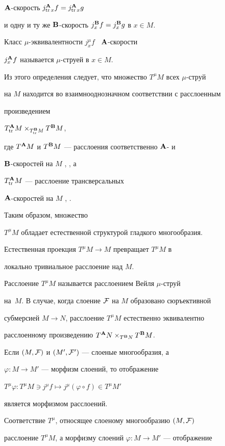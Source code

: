 ${\bold A}$-скорость $j_{\operatorname{tr} x}^{{\bold A}} f=j_{\operatorname{tr} x}^{{\bold A}} g$


и одну и ту же ${\bold B}$-скорость $j_{x}^{\bold B} f=j_{x}^{\bold B} g$ в $x\in M$.


Класс $\mu$-эквивалентности $j_x^\mu f$ \ ${\bold A}$-скорости


$j_x^{\bold A} f$ называется $\mu$-струей в $x\in M$.


Из этого определения следует, что множество $T^\mu M$ всех $\mu$-струй


на $M$ находится во взаимнооднозначном соответствии с расслоенным


произведением


$T_{\operatorname{tr}}^{\bold A}M\times_{T_{\operatorname{tr}}^{\bold B}M}T^{\bold B}M$,


где $T^{\bold A} M$ и $T^{\bold B} M$ --- расслоения соответственно ${\bold A}$- и


${\bold B}$-скоростей на $M$ \cite{KMS}, \cite{VSh31}, а


$T_{\operatorname{tr}}^{\bold A} M$ --- расслоение трансверсальных\linebreak


${\bold A}$-скоростей на $M$ \cite{Pog}, \cite{VSh31}.


Таким образом, множество


$T^\mu M$ обладает естественной структурой гладкого многообразия.


Естественная проекция $T^\mu M\to M$ превращает $T^\mu M$ в


локально тривиальное расслоение над $M$.


Расслоение $T^\mu M$ называется \cite{ShS} расслоением Вейля $\mu$-струй


на~$M$. В случае, когда слоение $\cal F$ на $M$ образовано сюръективной


субмерсией $M\to N$, расслоение $T^\mu M$ естественно эквивалентно


расслоенному произведению $T^{\bold A}N\times_{T^{\bold B}N}T^{\bold B}M$.





Если $(M,{\cal F})$ и $(M',{\cal F}')$ --- слоеные многообразия, а


$\varphi:M\to M'$ --- морфизм слоений, то отображение


$T^\mu\varphi:T^\mu M\ni j^\mu f\mapsto j^\mu(\varphi\circ f)\in T^\mu M'$


является морфизмом расслоений.


Соответствие $T^\mu$, относящее слоеному многообразию $(M,{\cal F})$


расслоение $T^\mu M$, а морфизму слоений $\varphi:M\to M'$ --- отображение


